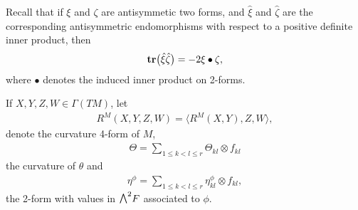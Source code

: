 \documentclass[10pt,a4paper]{amsart}
\newcommand{\ext}{\raise1pt\hbox{\small$\bigwedge$}}
\newcommand{\tr}{\mbox{\bf tr}}
\numberwithin{equation}{section}
\begin{document}
Recall that if $\xi$ and $\zeta$ are antisymmetic two forms, and $\hat\xi$ and $\hat\zeta$ are the corresponding antisymmetric endomorphisms with respect to a positive definite inner product, then
\begin{gather*}\tr\big(\hat\xi\hat\zeta\big) = -2 \xi\bullet\zeta,\end{gather*}
where $\bullet$ denotes the induced inner product on 2-forms.

If $X,Y,Z,W\in\Gamma(TM)$, let
\begin{gather*}R^M(X,Y,Z,W)=\big\langle R^M(X,Y),Z,W\big\rangle ,\end{gather*}
denote the curvature 4-form of $M$,
\begin{gather*}
 \Theta = \sum_{1\leq k<l \leq r} \Theta_{kl}\otimes f_{kl}
\end{gather*}
the curvature of $\theta$
and
\begin{gather*}
 \eta^\phi = \sum_{1\leq k<l \leq r} \eta_{kl}^\phi\otimes f_{kl},
\end{gather*}
the 2-form with values in $\ext^2F$ associated to $\phi$.
\end{document}
